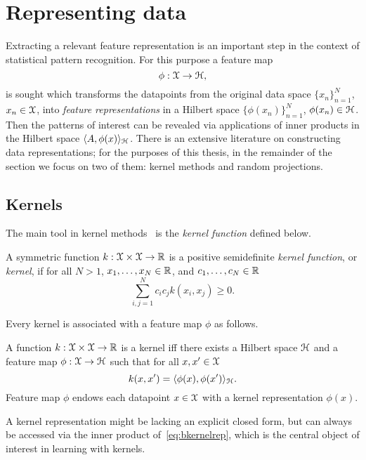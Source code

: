 \section{Representing data}
\label{sec:b-representing-data}
Extracting a relevant feature representation is an important step in the context of statistical pattern recognition. For this purpose a feature map 
\[
\phi: \mathcal{X} \rightarrow \mathcal{H},
\]
is sought which transforms the datapoints from the original data space $\{x_n\}_{n=1}^{N}$, $x_n \in \mathcal{X}$, into \emph{feature representations} in a Hilbert space $\{\phi(x_n)\}_{n=1}^{N}$, $\phi(x_n) \in \mathcal{H}$. Then the patterns of interest can be revealed via applications of inner products in the Hilbert space $\langle A, \phi(x) \rangle_{\mathcal{H}}$. There is an extensive literature on constructing data representations; for the purposes of this thesis, in the remainder of the section we focus on two of them: kernel methods and random projections.


\subsection{Kernels}
\label{subsec:b-kernels}

The main tool in kernel methods~\citep{scholkopf02} is the \emph{kernel function} defined below.
\begin{ndefn} \label{def:bkernelfun}
	A symmetric function $k: \mathcal{X} \times \mathcal{X} \rightarrow \mathbb{R} $ is a positive semidefinite \emph{kernel function}, or \emph{kernel}, if for all $N>1$, $x_1, \ldots, x_N \in \mathbb{R}$, and $c_1, \ldots, c_N \in \mathbb{R}$ 
	\[
	\sum_{i,j=1}^{N} c_ic_j k(x_i, x_j) \geq 0.
	\]
\end{ndefn}

Every kernel is associated with a feature map $\phi$ as follows.

\begin{ndefn} \label{def:bkernelrepr}
	 A function $k: \mathcal{X} \times \mathcal{X} \rightarrow \mathbb{R}$ is a kernel iff there exists a Hilbert space $\mathcal{H}$ and a feature map $\phi: \mathcal{X} \rightarrow \mathcal{H}$ such that for all $x, x' \in \mathcal{X}$
	 \[
	 \label{eq:bkernelrep}
	 k(x,x') = \langle \phi(x), \phi(x') \rangle_{\mathcal{H}}.
	 \]
	 Feature map $\phi$ endows each datapoint $x \in \mathcal{X}$ with a kernel representation $\phi(x)$.
\end{ndefn}
A kernel representation might be lacking an explicit closed form, but can always be accessed via the inner product of~\cref{eq:bkernelrep}, which is the central object of interest in learning with kernels.

